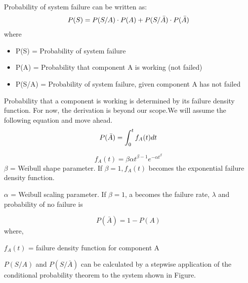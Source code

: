 \documentclass{article}
\begin{document}
\begin{itemize}
  \cite{cite9} Probability of system failure can be written as:
  \begin{equation}
    P(S) = P(S/A)\cdot P(A) + P(S/\Bar{A})\cdot P(\Bar{A})
  \end{equation}
  where \begin{itemize}
  \item P(S) = Probability of system failure
  \item P(A) = Probability that component A is working (not failed)
  \item P(S/A) = Probability of system failure, given component A has not failed
  \end{itemize}
  Probability that a component is working is determined by its failure density function. For now, the derivation is beyond our scope.We will assume the following equation and move ahead.
  \begin{equation}\label{eq:2}
    P(\Bar{A}) = \int_{0}^{t}f_{A}(t)dt
  \end{equation}

  \[f_{A}(t) = \beta \alpha t^{\beta-1} e^{-\alpha t^{\beta}}\]
  $\beta$ = Weibull shape parameter. If $\beta = 1, f_{A}(t)$ becomes the exponential failure density function.

  $\alpha$ = Weibull scaling parameter. If $\beta = 1$, a becomes the failure rate, $\lambda$ and probability of no failure is

  \[P(\bar{A}) = 1 - P(A)\]
  where,

  $f_{A}(t)$ = failure density function for component A

  $P(S/A)$ and $P(S/\bar{A})$ can be calculated by a stepwise application of the conditional probability theorem to the system shown in Figure.


\end{itemize}
\end{document}
